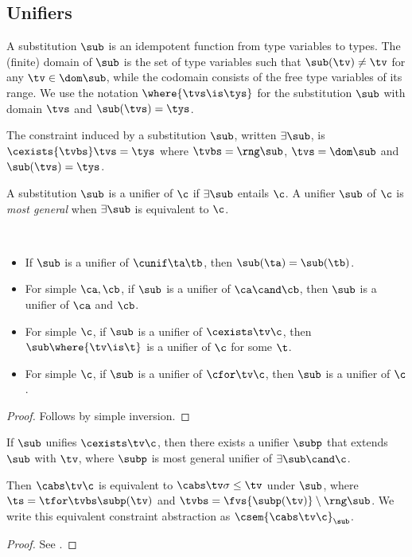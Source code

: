 \documentclass[acmsmall,screen,nonacm%
\Anonymous{,anonymous}{}%
\Final{}{,review}%
]{acmart}
\newcommand{\BBemlti}{Pottier-Remy/emlti} %
\providecommand{\DIFaddbegin}{} %
\providecommand{\DIFaddend}{} %
\providecommand{\DIFdelbegin}{} %
\providecommand{\DIFdelend}{} %
\begin{document}
\subsection{Unifiers}

A substitution $\sub$ is an idempotent function from type variables to types.
The (finite) domain of $\sub$ is the set of type variables such that $\sub(\tv)
\neq \tv$ for any $\tv \in \dom \sub$, while the codomain consists of the free
type variables of its range.
%
We use the notation $\where{\tvs \is \tys}$ for the substitution $\sub$ with
domain $\tvs$ and $\sub(\tvs) = \tys$.

The constraint induced by a substitution $\sub$, written $\exists \sub$, is
$\cexists {\tvbs} \tvs = \tys$ where $\tvbs = \rng \sub$, $\tvs = \dom \sub$
and $\sub(\tvs) = \tys$.

\begin{definition}[Unifier]
  A substitution $\sub$ is a unifier of $\c$ if $\exists \sub$ entails $\c$.
  A unifier $\sub$ of $\c$ is \emph{most general} when $\exists \sub$ is equivalent
  to $\c$.
\end{definition}

\begin{lemma}
  \label{lem:unifier-simple-inversion}
  ~
  \begin{itemize}
    \item If $\sub$ is a unifier of $\cunif \ta \tb$, then $\sub(\ta) = \sub(\tb)$.
    \item For simple $\ca, \cb$, if $\sub$ is a unifier of $\ca \cand \cb$, then $\sub$ is a unifier of $\ca$ and $\cb$.
    \item For simple $\c$, if $\sub$ is a unifier of $\cexists \tv \c$, then $\sub\where{\tv \is \t}$ is a unifier of $\c$ for some $\t$.
    \item For simple $\c$, if $\sub$ is a unifier of $\cfor \tv \c$, then $\sub$ is a unifier of $\c$.
  \end{itemize}
  \begin{proof}
    Follows by simple inversion.
  \end{proof}
\end{lemma}

\begin{lemma}
  \label{lem:unifier-abs-equiv}
  If $\sub$ unifies $\cexists \tv \c$, then there exists a unifier $\subp$ that extends $\sub$ with $\tv$,
  where $\subp$ is most general unifier of $\exists \sub \cand \c$.


  Then $\cabs \tv \c$ is equivalent to $\cabs \tv \sigma \leq \tv$ under $\sub$, where $\ts = \tfor \tvbs \subp(\tv)$ and
  $\tvbs = \fvs {\subp(\tv)} \setminus \rng \sub$. We write this equivalent constraint abstraction as $\csem {\cabs \tv \c}_\sub$.
  \begin{proof}
    See \DIFdelbegin %
\DIFdelend \DIFaddbegin \citet*{\BBemlti}\DIFaddend .
  \end{proof}
\end{lemma}
\end{document}
